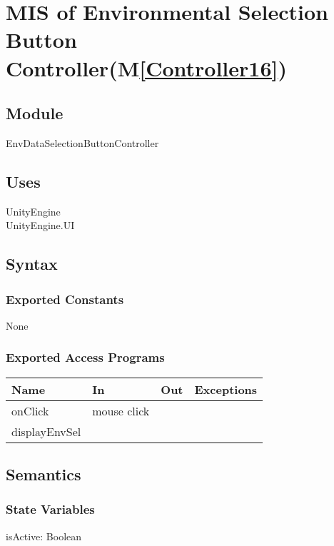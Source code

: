 \documentclass[12pt, titlepage]{article}
\newcommand{\mref}[1]{M\ref{#1}}
\begin{document}

\section{MIS of Environmental Selection Button Controller(\mref{Controller16})} 

\subsection{Module}
EnvDataSelectionButtonController


\subsection{Uses}
UnityEngine\\
UnityEngine.UI\\

\subsection{Syntax}

\subsubsection{Exported Constants}
None
\subsubsection{Exported Access Programs}

\begin{center}
\begin{tabular}{| l | l | l | p{5cm}|}
\hline
\textbf{Name} & \textbf{In} & \textbf{Out} & \textbf{Exceptions} \\
\hline
onClick & mouse click &  &  \\
\hline
displayEnvSel &&&\\
\hline
\end{tabular}
\end{center}

\subsection{Semantics}

\subsubsection{State Variables}
isActive: Boolean
\end{document}
